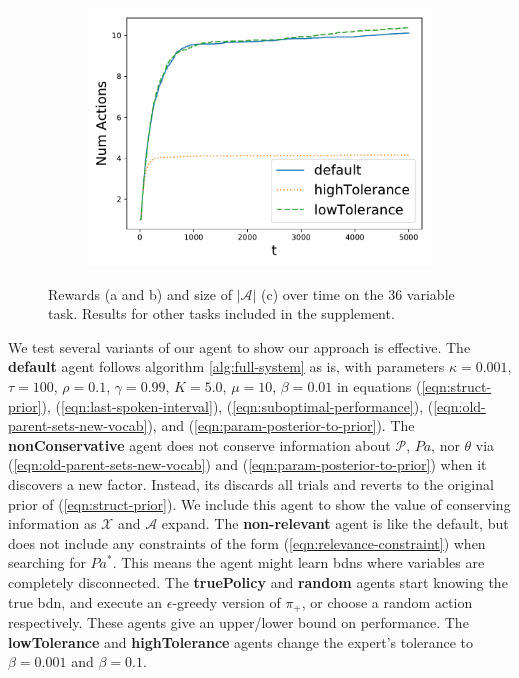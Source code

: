 \documentclass{article}
\newcommand{\bdn}{{\sc bdn}}
\newcommand{\Pa}{\mathit{Pa}}
\begin{document}
\begin{figure}
\begin{subfigure}{0.333\textwidth}
			\includegraphics[width=\textwidth]{coffeeVocabSize}
			\caption{}
			\label{fig:results:vocab}
		\end{subfigure}		
		\caption{Rewards (a and b) and size of $|\mathcal{A}|$ (c) over time on the 36 variable task. Results for other tasks included in the supplement.}
		\label{fig:results}
	\end{figure}
	
	We test several variants of our agent to show our approach is effective. The \textbf{default} agent follows algorithm \ref{alg:full-system} as is, with parameters $\kappa=0.001$, $\tau = 100$, $\rho = 0.1$, $\gamma=0.99$,  $K = 5.0$, $\mu=10$, $\beta=0.01$ in equations (\ref{eqn:struct-prior}), (\ref{eqn:last-spoken-interval}), (\ref{eqn:suboptimal-performance}), (\ref{eqn:old-parent-sets-new-vocab}), and (\ref{eqn:param-posterior-to-prior}). The \textbf{nonConservative} agent does not conserve information about $\mathcal{P}$, $\Pa$, nor $\theta$ via (\ref{eqn:old-parent-sets-new-vocab}) and (\ref{eqn:param-posterior-to-prior}) when it discovers a new factor. Instead, its discards all trials and reverts to the original prior of (\ref{eqn:struct-prior}). We include this agent to show the value of conserving information as $\mathcal{X}$ and $\mathcal{A}$ expand. The \textbf{non-relevant} agent is like the default, but does not include any constraints of the form (\ref{eqn:relevance-constraint}) when searching for $\Pa^*$. This means the agent might learn \bdn{}s where variables are completely disconnected. The \textbf{truePolicy} and \textbf{random} agents start knowing the true \bdn{}, and execute an $\epsilon$-greedy version of $\pi_+$, or choose a random action respectively. These agents give an upper/lower bound on performance. The \textbf{lowTolerance} and \textbf{highTolerance} agents change the expert's tolerance to $\beta=0.001$ and $\beta=0.1$.
	
\end{document}
